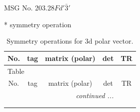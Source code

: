 \documentclass[fleqn,8pt]{jsarticle}
\begin{document}
\setcounter{MaxMatrixCols}{32}

\renewcommand{\tablename}{Table~}
\renewcommand{\figurename}{Figure~}
\begin{center}
\LARGE
MSG No. 203.28\quad$Fd'\bar{3}'$
\end{center}
* symmetry operation
\renewcommand{\arraystretch}{1.3}
\begin{longtable}{ccccc}
\caption{Symmetry operations for 3d polar vector.}
 \\
 \hline \hline
No. & tag & matrix (polar) & det & TR \\ \hline \endfirsthead

\multicolumn{4}{l}{\tablename\ \thetable{}} \\
 \hline \hline
No. & tag & matrix (polar) & det & TR \\ \hline \endhead

 \hline \hline
\multicolumn{4}{r}{\footnotesize\it continued ...} \\ \endfoot

 \hline \hline
\multicolumn{4}{r}{} \\ \endlastfoot


\end{longtable}
\end{document}
